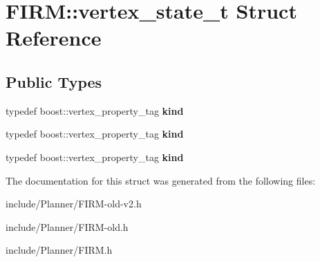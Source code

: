 \hypertarget{struct_f_i_r_m_1_1vertex__state__t}{\section{\-F\-I\-R\-M\-:\-:vertex\-\_\-state\-\_\-t \-Struct \-Reference}
\label{struct_f_i_r_m_1_1vertex__state__t}
}
\subsection*{\-Public \-Types}
\begin{DoxyCompactItemize}
\item 
\hypertarget{struct_f_i_r_m_1_1vertex__state__t_a1917aebbc6fd5d22c666bb6400546c15}{typedef boost\-::vertex\-\_\-property\-\_\-tag {\bfseries kind}}\label{struct_f_i_r_m_1_1vertex__state__t_a1917aebbc6fd5d22c666bb6400546c15}

\item 
\hypertarget{struct_f_i_r_m_1_1vertex__state__t_a1917aebbc6fd5d22c666bb6400546c15}{typedef boost\-::vertex\-\_\-property\-\_\-tag {\bfseries kind}}\label{struct_f_i_r_m_1_1vertex__state__t_a1917aebbc6fd5d22c666bb6400546c15}

\item 
\hypertarget{struct_f_i_r_m_1_1vertex__state__t_a1917aebbc6fd5d22c666bb6400546c15}{typedef boost\-::vertex\-\_\-property\-\_\-tag {\bfseries kind}}\label{struct_f_i_r_m_1_1vertex__state__t_a1917aebbc6fd5d22c666bb6400546c15}

\end{DoxyCompactItemize}


\-The documentation for this struct was generated from the following files\-:\begin{DoxyCompactItemize}
\item 
include/\-Planner/\-F\-I\-R\-M-\/old-\/v2.\-h\item 
include/\-Planner/\-F\-I\-R\-M-\/old.\-h\item 
include/\-Planner/\-F\-I\-R\-M.\-h\end{DoxyCompactItemize}
